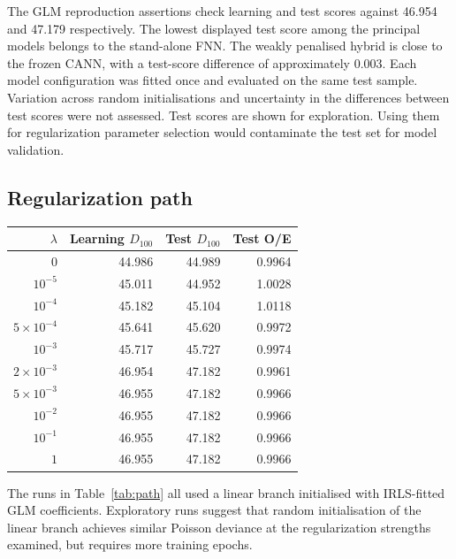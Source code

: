 \documentclass[a4paper]{article}
\begin{document}
The GLM reproduction assertions check learning and test scores against
46.954 and 47.179 respectively.
The lowest displayed test score among the principal models belongs to
the stand-alone FNN.
The weakly penalised hybrid is close to the frozen CANN, with a test-score
difference of approximately 0.003.
Each model configuration was fitted once and evaluated on the same test sample.
Variation across random initialisations and uncertainty in the differences
between test scores were not assessed.
Test scores are shown for exploration. Using them for regularization parameter selection would contaminate the test set for model validation.

\subsection{Regularization path}
\addvspace{\baselineskip}
\noindent
\begin{minipage}{\textwidth}
    \label{tab:path}
    \centering
\begin{tabular}{rrrr}
\hline
$\lambda$ & Learning $D_{100}$ & Test $D_{100}$ & Test O/E\\
\hline
$0$ & 44.986 & 44.989 & 0.9964\\
$10^{-5}$ & 45.011 & 44.952 & 1.0028\\
$10^{-4}$ & 45.182 & 45.104 & 1.0118\\
$5\times10^{-4}$ & 45.641 & 45.620 & 0.9972\\
$10^{-3}$ & 45.717 & 45.727 & 0.9974\\
$2\times10^{-3}$ & 46.954 & 47.182 & 0.9961\\
$5\times10^{-3}$ & 46.955 & 47.182 & 0.9966\\
$10^{-2}$ & 46.955 & 47.182 & 0.9966\\
$10^{-1}$ & 46.955 & 47.182 & 0.9966\\
$1$ & 46.955 & 47.182 & 0.9966\\
\hline
\end{tabular}
\end{minipage}\par
\addvspace{\baselineskip}

The runs in Table~\ref{tab:path} all used a linear branch initialised
with IRLS-fitted GLM coefficients.
Exploratory runs suggest that random initialisation of the linear branch
achieves similar Poisson deviance at the regularization strengths examined,
but requires more training epochs.
\end{document}
